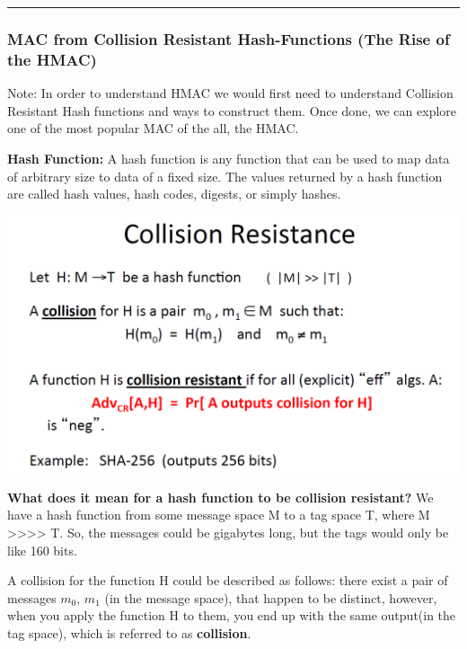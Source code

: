 \documentclass[11pt]{article}
\makeatletter
\def\maxwidth{\ifdim\Gin@nat@width>\linewidth\linewidth
    \else\Gin@nat@width\fi}
\let\Oldincludegraphics\includegraphics
\renewcommand{\includegraphics}[1]{\Oldincludegraphics[width=.8\maxwidth]{#1}}
\makeatother
\begin{document}
\begin{center}\rule{0.5\linewidth}{\linethickness}\end{center}

    \hypertarget{mac-from-collision-resistant-hash-functions-the-rise-of-the-hmac}{%
\subsubsection{MAC from Collision Resistant Hash-Functions (The Rise of
the
HMAC)}\label{mac-from-collision-resistant-hash-functions-the-rise-of-the-hmac}}

Note: In order to understand HMAC we would first need to understand
Collision Resistant Hash functions and ways to construct them. Once
done, we can explore one of the most popular MAC of the all, the HMAC.

\textbf{Hash Function:} A hash function is any function that can be used
to map data of arbitrary size to data of a fixed size. The values
returned by a hash function are called hash values, hash codes, digests,
or simply hashes.

\includegraphics{./Images/CollisionResistance.png}

\textbf{What does it mean for a hash function to be collision
resistant?} We have a hash function from some message space M to a tag
space T, where \textbar{}M\textbar{}
\textgreater{}\textgreater{}\textgreater{}\textgreater{}
\textbar{}T\textbar{}. So, the messages could be gigabytes long, but the
tags would only be like 160 bits.

A collision for the function H could be described as follows: there
exist a pair of messages \(m_{0}\), \(m_{1}\) (in the message space),
that happen to be distinct, however, when you apply the function H to
them, you end up with the same output(in the tag space), which is
referred to as \textbf{collision}.
\end{document}

